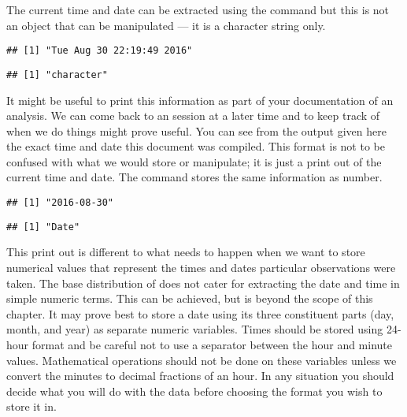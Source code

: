 The current time and date can be extracted using the  command but this is not an object that can be manipulated --- it is a character string only. 
\begin{knitrout}
\color{fgcolor}\begin{kframe}
\begin{alltt}
\hlstd{()}
\end{alltt}
\begin{verbatim}
## [1] "Tue Aug 30 22:19:49 2016"
\end{verbatim}
\begin{alltt}
\hlstd{(}\hlstd{())}
\end{alltt}
\begin{verbatim}
## [1] "character"
\end{verbatim}
\end{kframe}
\end{knitrout}
It might be useful to print this information as part of your documentation of an analysis. We can come back to an \R{} session at a later time and to keep track of when we do things might prove useful. You can see from the output given here the exact time and date this document was compiled. This format is not to be confused with what we would store or manipulate; it is just a print out of the current time and date. The  command stores the same information as number. 
\begin{knitrout}
\color{fgcolor}\begin{kframe}
\begin{alltt}
\hlstd{()}
\end{alltt}
\begin{verbatim}
## [1] "2016-08-30"
\end{verbatim}
\begin{alltt}
\hlstd{(}\hlstd{())}
\end{alltt}
\begin{verbatim}
## [1] "Date"
\end{verbatim}
\end{kframe}
\end{knitrout}
 
This print out is different to what needs to happen when we want to store numerical values that represent the times and dates particular observations were taken. The base distribution of \R{} does not cater for extracting the date and time in simple numeric terms. This can be achieved, but is beyond the scope of this chapter. It may prove best to store a date using its three constituent parts (day, month, and year) as separate numeric variables. Times should be stored using 24-hour format and be careful not to use a separator between the hour and minute values. Mathematical operations should not be done on these variables unless we convert the minutes to decimal fractions of an hour. In any situation you should decide what you will do with the data before choosing the format you wish to store it in. 
 
